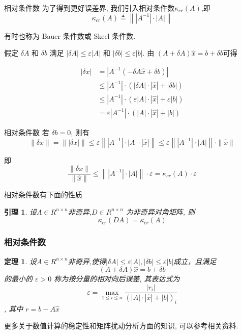 \documentclass[notheorems,serif]{beamer}
\newcommand{\hei}[1]{{\HEI#1}}
\newtheorem{theorem}{\hei{定理}}
\newtheorem{lemma}{\hei{引理}}
\begin{document}
\begin{frame}{相对条件数}
为了得到更好误差界, 我们引入相对条件数$\kappa_{cr}(A)$,即
\begin{equation}
\kappa_{c r}(A) \triangleq\left\|\left|A^{-1}\right| \cdot|A|\right\|
\end{equation}

有时也称为 Bauer 条件数或 Skeel 条件数.

假定 $δA$ 和 $δb$ 满足 $|δA| ≤ ε|A|$ 和 $|δb| ≤ ε|b|$. 由 $(A + δA)\hat{x} = b + δb $可得

\begin{equation}
\begin{aligned}|\delta x| &=\left|A^{-1}(-\delta A \hat{x}+\delta b)\right| \\ & \leq\left|A^{-1}\right| \cdot(|\delta A| \cdot|\hat{x}|+|\delta b|) \\ & \leq\left|A^{-1}\right| \cdot(\varepsilon|A| \cdot|\hat{x}|+\varepsilon|b|) \\ &=\varepsilon\left|A^{-1}\right| \cdot(|A| \cdot|\hat{x}|+|b|) \end{aligned}
\end{equation}
\end{frame}

\begin{frame}{相对条件数}
若 $δb = 0$, 则有
\begin{equation}
\|\delta x\|=\||\delta x|\| \leq \varepsilon\left\|\left|A^{-1}\right| \cdot|A| \cdot|\hat{x}|\right\| \leq \varepsilon\left\|\left|A^{-1}\right| \cdot|A|\right\| \cdot\|\hat{x}\|
\end{equation}

即
\begin{equation}
\frac{\|\delta x\|}{\|\hat{x}\|} \leq\left\|\left|A^{-1}\right| \cdot|A|\right\| \cdot \varepsilon=\kappa_{c r}(A) \cdot \varepsilon
\end{equation}

相对条件数有下面的性质

\begin{lemma}
	设$ A∈ R^{n×n}$非奇异,$D ∈ R^{n×n}$ 为非奇异对角矩阵, 则
	\begin{equation}
	\kappa_{c r}(D A)=\kappa_{c r}(A)
	\end{equation}
\end{lemma}
\end{frame}

\begin{frame}
\frametitle{相对条件数}
\begin{theorem}
	设$ A∈ R^{n×n}$非奇异,使得$|\delta A| \leq \varepsilon|A|,|\delta b| \leq \varepsilon|b|$成立，且满足
	\begin{equation}
	(A+\delta A) \hat{x}=b+\delta b
	\end{equation}
	的最小的 $ε > 0$ 称为按分量的相对向后误差, 其表达式为
	\begin{equation}
	\varepsilon=\max _{1 \leq i \leq n} \frac{\left|r_{i}\right|}{(|A| \cdot|\hat{x}|+|b|)_{i}}
	\end{equation},
	其中 $r = b − A\hat{x}$
\end{theorem}

更多关于数值计算的稳定性和矩阵扰动分析方面的知识, 可以参考相关资料.
\end{frame}
\end{document}
